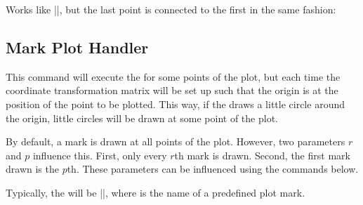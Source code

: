 \begin{command}{\pgfplothandlergapcycle}
  Works like |\pgfplothandlergaplineto|, but the last point is
  connected to the first in the same fashion:
\begin{codeexample}[]
\end{codeexample}
\end{command}

\subsection{Mark Plot Handler}

\label{section-plot-marks}

\begin{command}{\pgfplothandlermark{}}
  This command will execute the  for some points of the
  plot, but each time the coordinate transformation matrix will be
  set up such that the origin is at the position of the point to be
  plotted. This way, if the  draws a little circle
  around the origin, little circles will be drawn at some point of the
  plot.

  By default, a mark is drawn at all points of the plot. However, two
  parameters $r$ and $p$ influence this. First, only every $r$th mark
  is drawn. Second, the first mark drawn is the $p$th. These
  parameters can be influenced using the commands below.
  
\begin{codeexample}[]
\end{codeexample}

  Typically, the  will be ||, where  is the name of a
  predefined plot mark.
\end{command}

